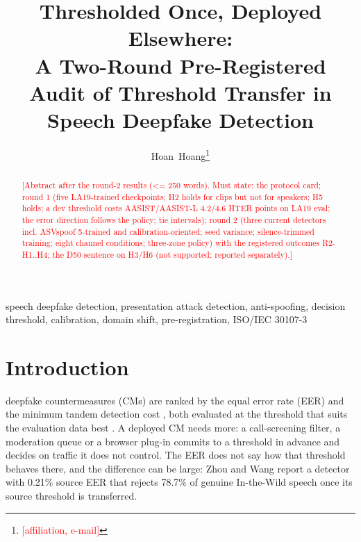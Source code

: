 \documentclass[journal]{IEEEtran}
\newif\ifblind
\newcommand{\todo}[1]{\textcolor{red}{[#1]}}
\begin{document}
\title{Thresholded Once, Deployed Elsewhere:\\ A Two-Round Pre-Registered Audit of Threshold Transfer in Speech Deepfake Detection}

\ifblind
\author{Anonymous T-BIOM Submission}
\else
\author{Hoan~Hoang\thanks{\todo{affiliation, e-mail}}}
\fi

\maketitle

\begin{abstract}
\todo{Abstract after the round-2 results (<= 250 words). Must state: the protocol card; round 1 (five LA19-trained
checkpoints; H2 holds for clips but not for speakers; H5 holds; a dev threshold costs AASIST/AASIST-L 4.2/4.6 HTER points on
LA19 eval; the error direction follows the policy; tie intervals); round 2 (three current detectors incl. ASVspoof 5-trained
and calibration-oriented; seed variance; silence-trimmed training; eight channel conditions; three-zone policy) with the
registered outcomes R2-H1..H4; the D50 sentence on H3/H6 (not supported; reported separately).}
\end{abstract}

\begin{IEEEkeywords}
speech deepfake detection, presentation attack detection, anti-spoofing, decision threshold, calibration, domain shift,
pre-registration, ISO/IEC 30107-3
\end{IEEEkeywords}

\section{Introduction}
\label{sec:intro}
 deepfake countermeasures (CMs) are ranked by the equal error rate (EER) and the minimum tandem
detection cost \cite{kinnunen18_tdcf}, both evaluated at the threshold that suits the evaluation data best
\cite{wang20_asvspoof2019,liu23_asvspoof2021}. A deployed CM needs more: a call-screening filter, a moderation queue or a
browser plug-in \cite{pascu25_edge_plugin} commits to a threshold in advance and decides on traffic it does not control.
The EER does not say how that threshold behaves there, and the difference can be large: Zhou and Wang
\cite{zhou26_eer_hides} report a detector with 0.21\% source EER that rejects 78.7\% of genuine In-the-Wild speech once its
source threshold is transferred.
\end{document}
